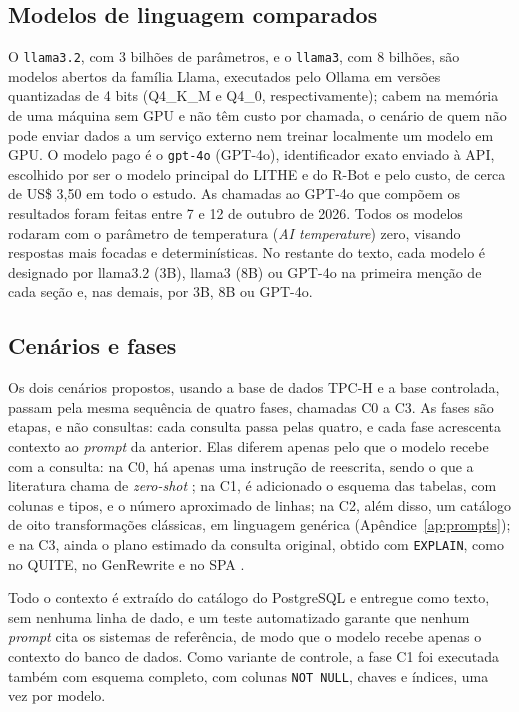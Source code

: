 \documentclass[12pt]{article}
\begin{document}
\subsection{Modelos de linguagem comparados}
\label{sec:modelos}

O \texttt{llama3.2}, com 3 bilhões de parâmetros, e o \texttt{llama3}, com 8 bilhões, são modelos abertos da família Llama, executados pelo Ollama em versões quantizadas de 4 bits (Q4\_K\_M e Q4\_0, respectivamente); cabem na memória de uma máquina sem GPU e não têm custo por chamada, o cenário de quem não pode enviar dados a um serviço externo nem treinar localmente um modelo em GPU. O modelo pago é o \texttt{gpt-4o} (GPT-4o), identificador exato enviado à API, escolhido por ser o modelo principal do LITHE \cite{dharwada2026lithe} e do R-Bot \cite{sun2025rbot} e pelo custo, de cerca de US\$ 3,50 em todo o estudo. As chamadas ao GPT-4o que compõem os resultados foram feitas entre 7 e 12 de outubro de 2026. Todos os modelos rodaram com o parâmetro de temperatura (\textit{AI temperature}) zero, visando respostas mais focadas e determinísticas. No restante do texto, cada modelo é designado por llama3.2 (3B), llama3 (8B) ou GPT-4o na primeira menção de cada seção e, nas demais, por 3B, 8B ou GPT-4o.

\subsection{Cenários e fases}
\label{sec:fases}

Os dois cenários propostos, usando a base de dados TPC-H e a base controlada, passam pela mesma sequência de quatro fases, chamadas C0 a C3. As fases são etapas, e não consultas: cada consulta passa pelas quatro, e cada fase acrescenta contexto ao \textit{prompt} da anterior. Elas diferem apenas pelo que o modelo recebe com a consulta: na C0, há apenas uma instrução de reescrita, sendo o que a literatura chama de \textit{zero-shot} \cite{brown2020fewshot}; na C1, é adicionado o esquema das tabelas, com colunas e tipos, e o número aproximado de linhas; na C2, além disso, um catálogo de oito transformações clássicas, em linguagem genérica (Apêndice~\ref{ap:prompts}); e na C3, ainda o plano estimado da consulta original, obtido com \texttt{EXPLAIN}, como no QUITE, no GenRewrite e no SPA \cite{song2025quite,liu2025genrewrite,huang2026spa}.

Todo o contexto é extraído do catálogo do PostgreSQL e entregue como texto, sem nenhuma linha de dado, e um teste automatizado garante que nenhum \textit{prompt} cita os sistemas de referência, de modo que o modelo recebe apenas o contexto do banco de dados. Como variante de controle, a fase C1 foi executada também com esquema completo, com colunas \texttt{NOT NULL}, chaves e índices, uma vez por modelo.
\end{document}
